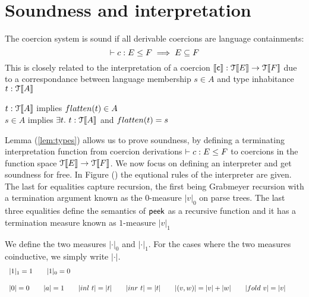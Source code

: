 \documentclass[a4paper,UKenglish,cleveref, autoref, thm-restate]{lipics-v2021}
\begin{document}
\section{Soundness and interpretation} \label{sec:soundinterp}
The coercion system is sound if all derivable coercions are language containments:
\[\contains{}{c}{E}{F} \implies E \subseteq F\]
This is closely related to the interpretation of a coercion $\llbracket \textsf{c} \rrbracket : \mathcal{T}\llbracket E \rrbracket \rightarrow \mathcal{T}\llbracket F \rrbracket$ due to a correspondance between language membership $s \in A$ and type inhabitance $\mathsf{t} : \type{A}$
\begin{lemma}\label{lem:types}
$\mathsf{t} : \type{A}$ implies $\flatten{\mathsf{t}} \in A$\\
$s \in A$ implies $\exists \mathsf{t}.~\mathsf{t} : \type{A}$ and $\flatten{\mathsf{t}} = s$
\end{lemma}
Lemma (\ref{lem:types}) allows us to prove soundness, by defining a terminating interpretation function from coercion derivations $\contains{}{c}{E}{F}$ to coercions in the function space $\mathcal{T}\llbracket E \rrbracket \rightarrow \mathcal{T}\llbracket F \rrbracket$.
We now focus on defining an interpreter and get soundness for free. In Figure (\label{fig:interp}) the equtional rules of the interpreter are given. The last for equalities capture recursion, the first being Grabmeyer recursion with a termination argument known as the $0$-measure $|v|_0$ on parse trees. The last three equalities define the semantics of $\textsf{peek}$ as a recursive function and it has a termination measure known as $1$-measure $|v|_1$ 
\begin{definition}
We define the two measures $|\cdot|_0$ and $|\cdot|_1$. For the cases where the two measures coinductive, we simply write $|\cdot|$.
  \begin{displaymath}
    \begin{array}{lll}
\onem{1} = 1 \qquad \zerom{1} = 0
\\\\
 \measure{0} = 0 \qquad \measure{a} = 1 \qquad \measure{inl~ t} = \measure{t} \qquad \measure{inr~ t} = \measure{t} \qquad  \measure{(v,w)}=\measure{v}+\measure{w} \qquad  \measure{fold~v}=\measure{v}\qquad


    \end{array}
  \end{displaymath}
\end{definition}
\end{document}
